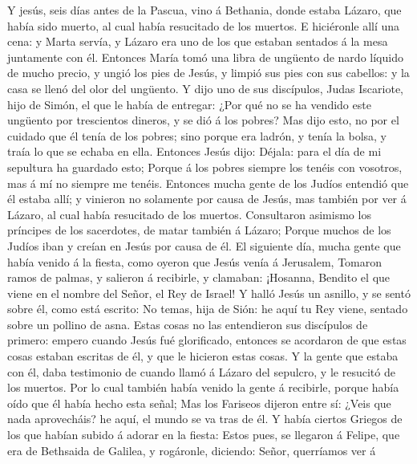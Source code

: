  Y jesús, seis días antes de la Pascua, vino á Bethania,
donde estaba Lázaro, que había sido muerto, al cual había resucitado de
los muertos.  E hiciéronle allí una cena: y Marta servía, y
Lázaro era uno de los que estaban sentados á la mesa juntamente con él.
 Entonces María tomó una libra de ungüento de nardo líquido
de mucho precio, y ungió los pies de Jesús, y limpió sus pies con sus
cabellos: y la casa se llenó del olor del ungüento.  Y dijo
uno de sus discípulos, Judas Iscariote, hijo de Simón, el que le había
de entregar:  ¿Por qué no se ha vendido este ungüento por
trescientos dineros, y se dió á los pobres?  Mas dijo esto,
no por el cuidado que él tenía de los pobres; sino porque era ladrón, y
tenía la bolsa, y traía lo que se echaba en ella.  Entonces
Jesús dijo: Déjala: para el día de mi sepultura ha guardado esto;
 Porque á los pobres siempre los tenéis con vosotros, mas á
mí no siempre me tenéis.  Entonces mucha gente de los Judíos
entendió que él estaba allí; y vinieron no solamente por causa de Jesús,
mas también por ver á Lázaro, al cual había resucitado de los muertos.
 Consultaron asimismo los príncipes de los sacerdotes, de
matar también á Lázaro;  Porque muchos de los Judíos iban y
creían en Jesús por causa de él.  El siguiente día, mucha
gente que había venido á la fiesta, como oyeron que Jesús venía á
Jerusalem,  Tomaron ramos de palmas, y salieron á
recibirle, y clamaban: ¡Hosanna, Bendito el que viene en el nombre del
Señor, el Rey de Israel!  Y halló Jesús un asnillo, y se
sentó sobre él, como está escrito:  No temas, hija de Sión:
he aquí tu Rey viene, sentado sobre un pollino de asna. 
Estas cosas no las entendieron sus discípulos de primero: empero cuando
Jesús fué glorificado, entonces se acordaron de que estas cosas estaban
escritas de él, y que le hicieron estas cosas.  Y la gente
que estaba con él, daba testimonio de cuando llamó á Lázaro del
sepulcro, y le resucitó de los muertos.  Por lo cual
también había venido la gente á recibirle, porque había oído que él
había hecho esta señal;  Mas los Fariseos dijeron entre sí:
¿Veis que nada aprovecháis? he aquí, el mundo se va tras de él.
 Y había ciertos Griegos de los que habían subido á adorar
en la fiesta:  Estos pues, se llegaron á Felipe, que era de
Bethsaida de Galilea, y rogáronle, diciendo: Señor, querríamos ver á
